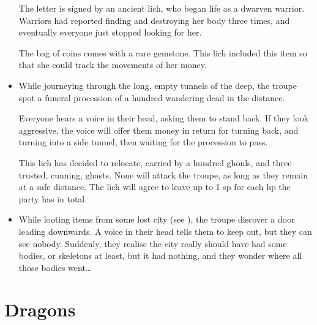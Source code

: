 \begin{multicols}{2}
\begin{itemize}
  The letter is signed by an ancient lich, who began life as a dwarven warrior.
  Warriors had reported finding and destroying her body three times, and eventually everyone just stopped looking for her.

  The bag of coins comes with a rare gemstone.
  This lich included this item so that she could track the movements of her money.
  \item
  While journeying through the long, empty tunnels of the \gls{deep}, the troupe spot a funeral procession of a hundred wandering dead in the distance.

  Everyone hears a voice in their head, asking them to stand back.
  If they look aggressive, the voice will offer them money in return for turning back, and turning into a side tunnel, then waiting for the procession to pass.

  This lich has decided to relocate, carried by a hundred ghouls, and three trusted, cunning, ghasts.
  None will attack the troupe, as long as they remain at a safe distance.
  The lich will agree to leave up to 1 \gls{sp} for each \gls{hp} the party has in total.
  \item
  While looting items from some lost city (see ), the troupe discover a door leading downwards.
  A voice in their head tells them to keep out, but they can see nobody.
  Suddenly, they realise the city really should have had some bodies, or skeletons at least, but it had nothing, and they wonder where all those bodies went\ldots
\end{itemize}

\end{multicols}

\section{Dragons}
\label{dragon}

